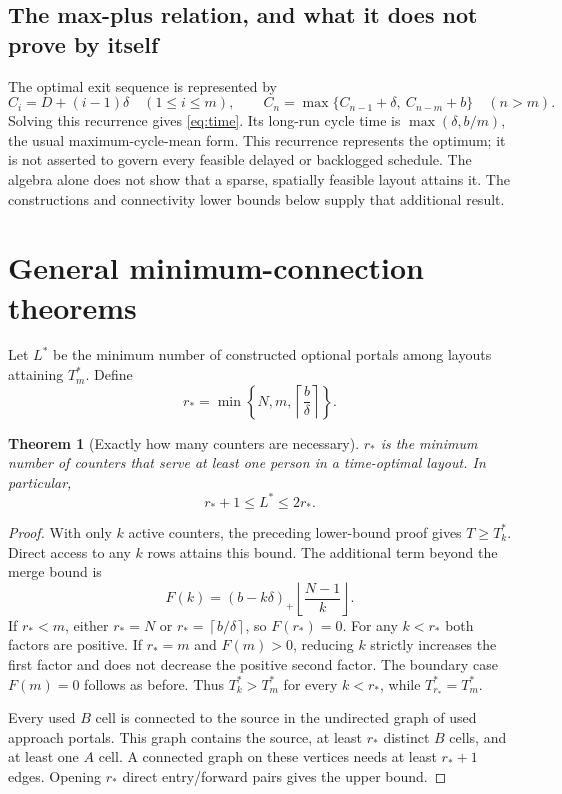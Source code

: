 \documentclass[11pt]{article}
\newtheorem{theorem}{Theorem}
\newcommand{\pos}[1]{\left(#1\right)_{+}}
\newcommand{\ceil}[1]{\left\lceil#1\right\rceil}
\newcommand{\floor}[1]{\left\lfloor#1\right\rfloor}
\begin{document}
\subsection{The max-plus relation, and what it does not prove by itself}
The optimal exit sequence is represented by
\[
 C_i=D+(i-1)\delta\quad(1\le i\le m),\qquad
 C_n=\max\{C_{n-1}+\delta,\ C_{n-m}+b\}\quad(n>m).
\]
Solving this recurrence gives \eqref{eq:time}. Its long-run cycle time is $\max(\delta,b/m)$, the usual maximum-cycle-mean form. This recurrence represents the optimum; it is not asserted to govern every feasible delayed or backlogged schedule. The algebra alone does not show that a sparse, spatially feasible layout attains it. The constructions and connectivity lower bounds below supply that additional result.

\section{General minimum-connection theorems}
Let $L^*$ be the minimum number of constructed optional portals among layouts attaining $T_m^*$. Define
\[
 r_* = \min\left\{N,m,\ceil{\frac{b}{\delta}}\right\}.
\]

\begin{theorem}[Exactly how many counters are necessary]
$r_*$ is the minimum number of counters that serve at least one person in a time-optimal layout. In particular,
\[
 r_*+1\le L^*\le 2r_*.
\]
\end{theorem}
\begin{proof}
With only $k$ active counters, the preceding lower-bound proof gives $T\ge T_k^*$. Direct access to any $k$ rows attains this bound. The additional term beyond the merge bound is
\[
 F(k)=\pos{b-k\delta}\floor{\frac{N-1}{k}}.
\]
If $r_*<m$, either $r_*=N$ or $r_*=\ceil{b/\delta}$, so $F(r_*)=0$. For any $k<r_*$ both factors are positive. If $r_*=m$ and $F(m)>0$, reducing $k$ strictly increases the first factor and does not decrease the positive second factor. The boundary case $F(m)=0$ follows as before. Thus $T_k^*>T_m^*$ for every $k<r_*$, while $T_{r_*}^*=T_m^*$.

Every used $B$ cell is connected to the source in the undirected graph of used approach portals. This graph contains the source, at least $r_*$ distinct $B$ cells, and at least one $A$ cell. A connected graph on these vertices needs at least $r_*+1$ edges. Opening $r_*$ direct entry/forward pairs gives the upper bound.
\end{proof}
\end{document}
